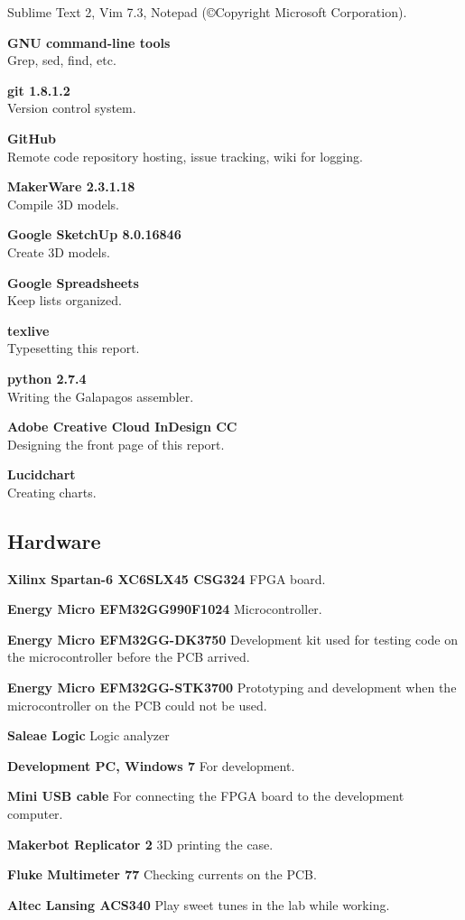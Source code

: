 \begin{description}
        Sublime Text 2, Vim 7.3, Notepad (©Copyright Microsoft Corporation).
    \item{\textbf{GNU command-line tools}} \\
        Grep, sed, find, etc.
    \item{\textbf{git 1.8.1.2}} \\
        Version control system.
    \item{\textbf{GitHub}} \\
        Remote code repository hosting, issue tracking, wiki for logging.
    \item{\textbf{MakerWare 2.3.1.18}} \\
        Compile 3D models.
    \item{\textbf{Google SketchUp 8.0.16846}} \\
        Create 3D models.
    \item{\textbf{Google Spreadsheets}} \\
        Keep lists organized.
    \item{\textbf{texlive}} \\
        Typesetting this report.
    \item{\textbf{python 2.7.4}} \\
        Writing the Galapagos assembler.
    \item{\textbf{Adobe Creative Cloud InDesign CC}} \\
        Designing the front page of this report.
    \item{\textbf{Lucidchart}} \\
        Creating charts.
\end{description}

\subsection{Hardware}
\begin{description}
\item{\textbf{Xilinx Spartan-6 XC6SLX45 CSG324}}
    FPGA board.
\item{\textbf{Energy Micro EFM32GG990F1024}}
    Microcontroller.
\item{\textbf{Energy Micro EFM32GG-DK3750}}
    Development kit used for testing code on the microcontroller before the PCB arrived.
\item{\textbf{Energy Micro EFM32GG-STK3700}}
    Prototyping and development when the microcontroller on the PCB could not be used.
\item{\textbf{Saleae Logic}}
    Logic analyzer
\item{\textbf{Development PC, Windows 7}}
    For development.
\item{\textbf{Mini USB cable}}
    For connecting the FPGA board to the development computer.
\item{\textbf{Makerbot Replicator 2}}
    3D printing the case.
\item{\textbf{Fluke Multimeter 77}}
    Checking currents on the PCB.
\item{\textbf{Altec Lansing ACS340}}
    Play sweet tunes in the lab while working.
\end{description}
